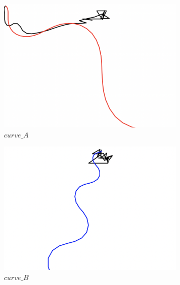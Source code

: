 \begin{figure}[H]
     \centering
     \begin{subfigure}[b]{0.31\textwidth}
         \centering
         \includegraphics[width=\textwidth]{images/ddpg_results/simple_envs_S1_S2/S2_A1_R3_K3_curve_A.png}
         \caption{$curve\_A$}
     \end{subfigure}
     \hfill
     \begin{subfigure}[b]{0.31\textwidth}
         \centering
         \includegraphics[width=\textwidth]{images/ddpg_results/simple_envs_S1_S2/S2_A1_R3_K3_curve_B.png}
         \caption{$curve\_B$}
     \end{subfigure}
     \hfill
     \begin{subfigure}[b]{0.31\textwidth}
         \centering

\end{subfigure}
\end{figure}
